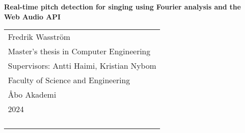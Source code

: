 
\begin{titlepage}
\vspace*{144pt}
\begin{center}
\Huge\bf Real-time pitch detection for singing using Fourier analysis and the Web Audio API
\end{center}
\enlargethispage{3cm}
\vfill

\hfill
\begin{tabular}[t]{l@{}}%
Fredrik Wasström\\ 
Master's thesis in Computer Engineering\\ 
Supervisors: Antti Haimi, Kristian Nybom \\
Faculty of Science and Engineering \\
Åbo Akademi\\ 
2024\\ 
\\
\\
\\
\\
\end{tabular}
\end{titlepage}

